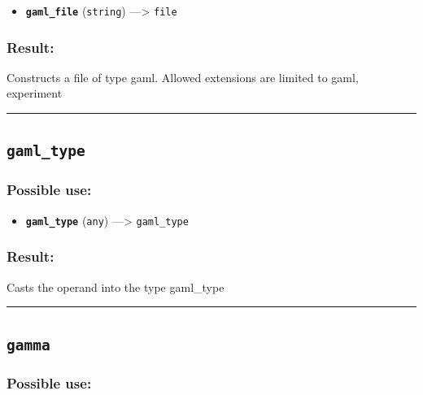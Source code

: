 \documentclass[]{book}
\providecommand{\tightlist}{%
  \setlength{\itemsep}{0pt}\setlength{\parskip}{0pt}}
\theoremstyle{definition}
\theoremstyle{definition}
\theoremstyle{definition}
\theoremstyle{remark}
\begin{document}
\begin{itemize}
\tightlist
\item
  \textbf{\texttt{gaml\_file}} (\texttt{string}) ---\textgreater{}
  \texttt{file}
\end{itemize}

\subsubsection{Result:}\label{result-172}

Constructs a file of type gaml. Allowed extensions are limited to gaml,
experiment

\begin{center}\rule{0.5\linewidth}{\linethickness}\end{center}

\subsection{\texorpdfstring{\texttt{gaml\_type}}{gaml\_type}}\label{gaml_type}

\subsubsection{Possible use:}\label{possible-use-179}

\begin{itemize}
\tightlist
\item
  \textbf{\texttt{gaml\_type}} (\texttt{any}) ---\textgreater{}
  \texttt{gaml\_type}
\end{itemize}

\subsubsection{Result:}\label{result-173}

Casts the operand into the type gaml\_type

\begin{center}\rule{0.5\linewidth}{\linethickness}\end{center}

\subsection{\texorpdfstring{\texttt{gamma}}{gamma}}\label{gamma}

\subsubsection{Possible use:}\label{possible-use-180}
\end{document}
